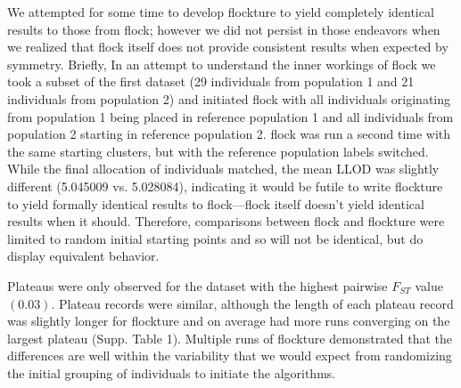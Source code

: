 We attempted for some time to develop {\sc flockture} to yield
completely identical results to those from {\sc flock}; however we did not
persist in those endeavors when we realized that {\sc flock} itself does
not provide consistent results when expected by symmetry.  Briefly, In an attempt to understand the
inner workings of {\sc flock} 
we took a subset of the 
first dataset (29 individuals from population 1 and 21 individuals from population 2) and initiated 
{\sc flock} with all individuals originating from population 1 being placed in reference population 1 and all 
individuals from population 2 starting in reference population 2. {\sc flock} was run a second time
with the same starting clusters, but with the reference population labels switched. While the final allocation
of individuals matched, the mean LLOD was slightly different (5.045009 vs. 5.028084), indicating it would
be futile to write {\sc flockture} to yield formally identical results to {\sc flock}---{\sc flock} itself
doesn't yield identical results when it should. Therefore, comparisons
between {\sc flock} and {\sc flockture} were limited to random initial starting points and so will not 
be identical, but do display equivalent behavior. 

Plateaus were only observed for the dataset 
with the highest pairwise $F_{ST}$ value $(0.03)$. Plateau records were similar, although 
the length of each plateau record was slightly longer for {\sc flockture} and on average had more runs converging on
the largest plateau (Supp. Table 1). Multiple runs of {\sc flockture} demonstrated that the differences are well within the
variability that we would expect from randomizing the initial grouping of individuals to 
initiate the algorithms.

